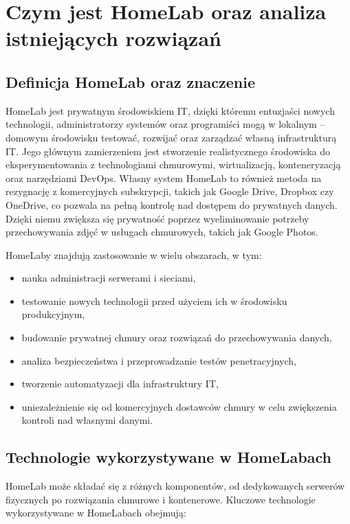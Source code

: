 \chapter{Czym jest HomeLab oraz analiza istniejących rozwiązań}

\section{Definicja HomeLab oraz znaczenie}
HomeLab jest prywatnym środowiskiem IT, dzięki któremu entuzjaści nowych technologii, administratorzy systemów oraz programiści mogą w lokalnym – domowym środowisku testować, rozwijać oraz zarządzać własną infrastrukturą IT. Jego głównym zamierzeniem jest stworzenie realistycznego środowiska do eksperymentowania z technologiami chmurowymi, wirtualizacją, konteneryzacją oraz narzędziami DevOps. Własny system HomeLab to również metoda na rezygnację z komercyjnych subskrypcji, takich jak Google Drive, Dropbox czy OneDrive, co pozwala na pełną kontrolę nad dostępem do prywatnych danych. Dzięki niemu zwiększa się prywatność poprzez wyeliminowanie potrzeby przechowywania zdjęć w usługach chmurowych, takich jak Google Photos.

HomeLaby znajdują zastosowanie w wielu obszarach, w tym:
\begin{itemize}
    \item nauka administracji serwerami i sieciami,
    \item testowanie nowych technologii przed użyciem ich w środowisku produkcyjnym,
    \item budowanie prywatnej chmury oraz rozwiązań do przechowywania danych,
    \item analiza bezpieczeństwa i przeprowadzanie testów penetracyjnych,
    \item tworzenie automatyzacji dla infrastruktury IT,
    \item uniezależnienie się od komercyjnych dostawców chmury w celu zwiększenia kontroli nad własnymi danymi.
\end{itemize}

\section{Technologie wykorzystywane w HomeLabach}
HomeLab może składać się z różnych komponentów, od dedykowanych serwerów fizycznych po rozwiązania chmurowe i kontenerowe. Kluczowe technologie wykorzystywane w HomeLabach obejmują:

